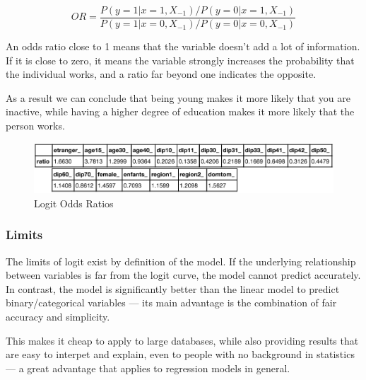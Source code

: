\begin{equation}
    OR = \frac{P(y=1|x=1, X_{-1})/P(y=0|x=1, X_{-1})}{P(y=1|x=0, X_{-1})/P(y=0|x=0, X_{-1})}
\end{equation}

An odds ratio close to 1 means that the variable doesn’t add a lot of information. If it is close to zero, it means the variable strongly increases the probability that the individual works, and a ratio far beyond one indicates the opposite.

As a result we can conclude that being young makes it more likely that you are inactive, while having a higher degree of education makes it more likely that the person works.

\begin{figure}
    \centering
    \includegraphics[scale=0.4]{img/logit_odds_ratios}
    \caption{Logit Odds Ratios}
    \label{fig:logit_odds_ratios}
\end{figure}




\subsubsection{Limits}
The limits of logit exist by definition of the model. If the underlying relationship between variables is far from the logit curve, the model cannot predict accurately. In contrast, the model is significantly better than the linear model to predict binary/categorical variables --- its main advantage is the combination of fair accuracy and simplicity.

This makes it cheap to apply to large databases, while also providing results that are easy to interpet and explain, even to people with no background in statistics --- a great advantage that applies to regression models in general.

